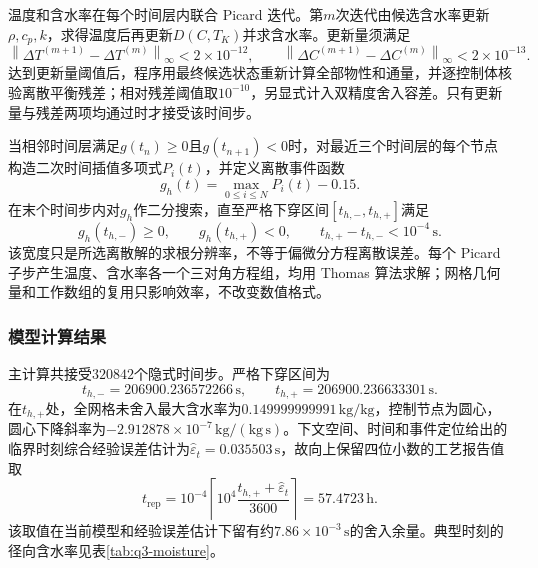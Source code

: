 \documentclass[withoutpreface,bwprint]{cumcmthesis}
\begin{document}
温度和含水率在每个时间层内联合 Picard 迭代。第$m$次迭代由候选含水率更新$\rho,c_p,k$，求得温度后再更新$D(C,T_K)$并求含水率。更新量须满足
\begin{equation}
\left\|\Delta T^{(m+1)}-\Delta T^{(m)}\right\|_\infty
<2\times10^{-12},
\qquad
\left\|\Delta C^{(m+1)}-\Delta C^{(m)}\right\|_\infty
<2\times10^{-13}.
\label{eq:q3-picard-criterion}
\end{equation}
达到更新量阈值后，程序用最终候选状态重新计算全部物性和通量，并逐控制体核验离散平衡残差；相对残差阈值取$10^{-10}$，另显式计入双精度舍入容差。只有更新量与残差两项均通过时才接受该时间步。

当相邻时间层满足$g(t_n)\ge0$且$g(t_{n+1})<0$时，对最近三个时间层的每个节点构造二次时间插值多项式$P_i(t)$，并定义离散事件函数
\begin{equation}
g_h(t)=\max_{0\le i\le N}P_i(t)-0.15.
\label{eq:q3-discrete-event}
\end{equation}
在末个时间步内对$g_h$作二分搜索，直至严格下穿区间$[t_{h,-},t_{h,+}]$满足
\begin{equation}
g_h(t_{h,-})\ge0,
\qquad
g_h(t_{h,+})<0,
\qquad
t_{h,+}-t_{h,-}<10^{-4}\,\mathrm s.
\label{eq:q3-event-bracket}
\end{equation}
该宽度只是所选离散解的求根分辨率，不等于偏微分方程离散误差。每个 Picard 子步产生温度、含水率各一个三对角方程组，均用 Thomas 算法求解；网格几何量和工作数组的复用只影响效率，不改变数值格式。


\subsubsection{模型计算结果}

主计算共接受$320842$个隐式时间步。严格下穿区间为
\begin{equation}
\boxed{
t_{h,-}=206900.236572266\,\mathrm s,
\qquad
t_{h,+}=206900.236633301\,\mathrm s.
}
\label{eq:q3-final-time}
\end{equation}
在$t_{h,+}$处，全网格未舍入最大含水率为$0.149999999991\,\mathrm{kg/kg}$，控制节点为圆心，圆心下降斜率为$-2.912878\times10^{-7}\,\mathrm{kg/(kg\,s)}$。下文空间、时间和事件定位给出的临界时刻综合经验误差估计为$\widehat\varepsilon_t=0.035503\,\mathrm s$，故向上保留四位小数的工艺报告值取
\begin{equation}
\boxed{
t_{\mathrm{rep}}
=10^{-4}\left\lceil
10^4\frac{t_{h,+}+\widehat\varepsilon_t}{3600}
\right\rceil
=57.4723\,\mathrm h.
}
\label{eq:q3-reported-time}
\end{equation}
该取值在当前模型和经验误差估计下留有约$7.86\times10^{-3}\,\mathrm s$的舍入余量。典型时刻的径向含水率见表\ref{tab:q3-moisture}。
\end{document}
